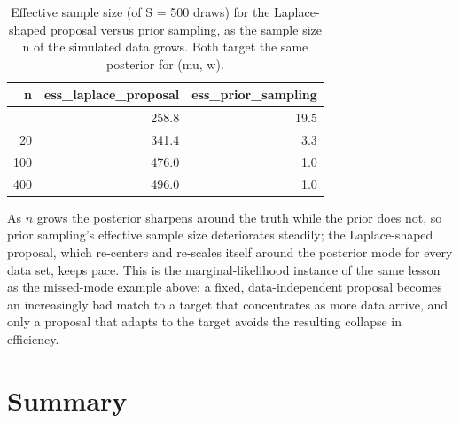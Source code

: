 \documentclass[
  letterpaper,
  DIV=11,
  numbers=noendperiod]{scrreprt}
\begin{document}
{

\begin{longtable}[]{@{}rrr@{}}

\caption{\label{tbl-marlik-ess-vs-n}Effective sample size (of S = 500
draws) for the Laplace-shaped proposal versus prior sampling, as the
sample size n of the simulated data grows. Both target the same
posterior for (mu, w).}

\tabularnewline

\toprule\noalign{}
n & ess\_laplace\_proposal & ess\_prior\_sampling \\
\midrule\noalign{}
\endhead
\bottomrule\noalign{}
\endlastfoot
5 & 258.8 & 19.5 \\
20 & 341.4 & 3.3 \\
100 & 476.0 & 1.0 \\
400 & 496.0 & 1.0 \\

\end{longtable}

}

As \(n\) grows the posterior sharpens around the truth while the prior
does not, so prior sampling's effective sample size deteriorates
steadily; the Laplace-shaped proposal, which re-centers and re-scales
itself around the posterior mode for every data set, keeps pace. This is
the marginal-likelihood instance of the same lesson as the missed-mode
example above: a fixed, data-independent proposal becomes an
increasingly bad match to a target that concentrates as more data
arrive, and only a proposal that adapts to the target avoids the
resulting collapse in efficiency.

\section{Summary}\label{summary-5}
\end{document}
